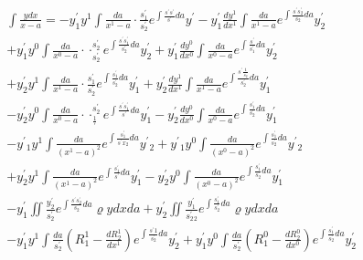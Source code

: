 \documentclass{article}
\begin{document}
\[
\begin{aligned}
& \int \frac{y d x}{x-a}=-y_{1}^{\prime} y^{1} \int \frac{d a}{x^{1}-a} \cdot \frac{s_{1}^{\prime}}{s_{2}^{\prime}} e^{\int \frac{s^{\prime} s^{\prime}}{s^{\prime}} d a} y^{\prime}-y_{1}^{\prime} \frac{d y^{1}}{d x^{1}} \int \frac{d a}{x^{1}-a} e^{\int \frac{s^{\prime} s_{2}^{\prime}}{s_{2}} d a} y_{2}^{\prime} \\
& +y_{1}^{\prime} y^{0} \int \frac{d a}{x^{0}-a} \cdot \cdot_{s_{2}^{\prime}}^{s_{2}^{\prime}} e^{\int \frac{s^{\prime} s_{1}^{\prime}}{s_{2}^{\prime}} d a} y_{2}^{\prime}+y_{1}^{\prime} \frac{d y^{0}}{d x^{0}} \int \frac{d a}{x^{0}-a} e^{\int \frac{s^{\prime}}{s_{1}^{\prime}} d a} y_{2}^{\prime} \\
& +y_{2}^{\prime} y^{1} \int \frac{d a}{x^{1}-a} \cdot \frac{s_{1}^{\prime}}{s_{2}^{\prime}} e^{\int \frac{s_{1}^{\prime}}{s_{2}^{\prime}} d a} y_{1}^{\prime}+y_{2}^{\prime} \frac{d y^{1}}{d x^{1}} \int \frac{d a}{x^{1}-a} e^{\int \frac{s^{\prime} \frac{1}{s_{2}^{\prime}}}{s_{2}^{\prime}} d a} y_{1}^{\prime} \\
& -y_{2}^{\prime} y^{0} \int \frac{d a}{x^{0}-a} \cdot \cdot_{\frac{1}{\prime}}^{s_{2}^{\prime}} e^{\int \frac{s^{\prime} s_{1}^{\prime}}{s^{\prime}} d a} y_{1}^{\prime}-y_{2}^{\prime} \frac{d y^{0}}{d x^{0}} \int \frac{d a}{x^{0}-a} e^{\int \frac{s_{1}^{\prime}}{s_{2}^{\prime}} d a} y_{1}^{\prime} \\
& -y^{\prime}{ }_{1} y^{1} \int \frac{d a}{\left(x^{1}-a\right)^{2}} e^{\int \frac{s_{1}^{\prime}}{s^{\prime} x_{2}} d a} y^{\prime}{ }_{2}+y^{\prime}{ }_{1} y^{0} \int \frac{d a}{\left(x^{0}-a\right)^{2}} e^{\int \frac{s_{1}^{\prime}}{s_{2}^{\prime}} d a} y^{\prime}{ }_{2} \\
& +y_{2}^{\prime} y^{1} \int \frac{d a}{\left(x^{1}-a\right)^{2}} e^{\int \frac{s_{1}^{\prime}}{s^{\prime}} d a} y_{1}^{\prime}-y_{2}^{\prime} y^{0} \int \frac{d a}{\left(x^{0}-a\right)^{2}} e^{\int \frac{s_{1}^{\prime}}{s_{2}^{\prime}} d a} y_{1}^{\prime} \\
& -y_{1}^{\prime} \iint \frac{y_{2}^{\prime}}{s_{2}^{\prime}} e^{\int \frac{s^{\prime} s_{2}^{\prime}}{s_{2}} d a} \varrho y d x d a+y_{2}^{\prime} \iint \frac{y_{1}^{\prime}}{s_{2}^{\prime}{ }_{2}} e^{\int \frac{s_{1}^{\prime}}{s_{2}^{\prime}} d a} \varrho y d x d a \\
& -y_{1}^{\prime} y^{1} \int \frac{d a}{s_{2}^{\prime}}\left(R_{1}^{1}-\frac{d R_{2}^{1}}{d x^{1}}\right) e^{\int \frac{s^{\prime} 1}{s_{2}^{\prime}} d a} y_{2}^{\prime}+y_{1}^{\prime} y^{0} \int \frac{d a}{s_{2}^{\prime}}\left(R_{1}^{0}-\frac{d R_{2}^{0}}{d x^{0}}\right) e^{\int \frac{s_{1}^{\prime}}{s_{2}^{\prime}} d a} y_{2}^{\prime} \\

\end{aligned}\]
\end{document}
